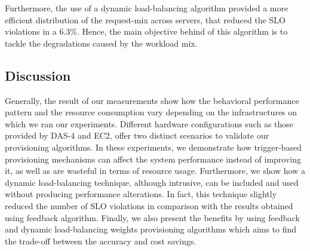 Furthermore, the use of a dynamic load-balancing algorithm provided a more efficient distribution of the request-mix across servers, that reduced the SLO violations in a 6.3\%. Hence, the main objective behind of this algorithm is to tackle the degradations caused by the workload mix.


	


\subsection*{Discussion}



Generally, the result of our measurements show how the behavioral performance pattern and the resource consumption vary depending on the infrastructures on which we ran our experiments. Different hardware configurations such as those provided by DAS-4 and EC2, offer two distinct scenarios to validate our provisioning algorithms.  In these experiments, we demonstrate how trigger-based provisioning mechanisms can affect the system performance instead of improving it, as well as are wasteful in terms of resource usage. Furthermore, we show how a dynamic load-balancing technique, although intrusive, can be included and used without producing performance alterations. In fact, this technique slightly reduced the number of SLO violations in comparison with the results obtained using feedback algorithm. Finally, we also present the benefits by using feedback and dynamic load-balancing weights provisioning algorithms which aims to find the trade-off between the accuracy and cost savings. 

